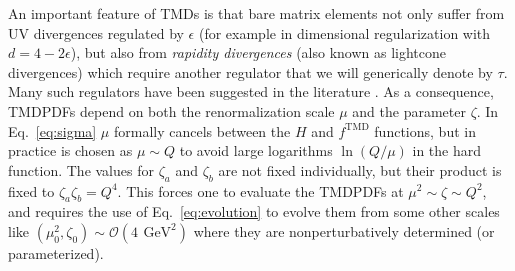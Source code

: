 \documentclass[prd,aps,twocolumn,bibnotes,nofootinbib,preprintnumbers,floatfix]{revtex4-1}
\DeclareRobustCommand{\eq}[1]{Eq.~\eqref{eq:#1}}
\newcommand{\eps}{\epsilon}
\newcommand{\cO}{\mathcal{O}}
\newcommand{\GeV}{\,\mathrm{GeV}}
\newcommand\TMD{\mathrm{TMD}}
\begin{document}
An important feature of TMDs is that bare matrix elements not only suffer from UV divergences regulated by $\epsilon$ (for example in dimensional regularization with $d=4-2\eps$), but also from \emph{rapidity divergences} (also known as lightcone divergences) which require another regulator \cite{Collins:1981uk,Collins:1992tv,Collins:2008ht,Becher:2010tm,GarciaEchevarria:2011rb,Chiu:2011qc,Chiu:2012ir} that we will generically denote by $\tau$.
Many such regulators have been suggested in the literature \cite{Collins:1981uk,Collins:1350496,Ji:2004wu,Beneke:2003pa, Chiu:2007yn, Becher:2011dz,Chiu:2011qc, Chiu:2012ir,Chiu:2009yx, GarciaEchevarria:2011rb,Li:2016axz}. As a consequence, TMDPDFs depend on both the renormalization scale $\mu$ and the parameter $\zeta$.  In \eq{sigma} $\mu$ formally cancels between the $H$ and $f^\TMD$ functions, but in practice is chosen as $\mu \sim Q$ to avoid large logarithms $\ln(Q/\mu)$ in the hard function.
The values for $\zeta_a$ and $\zeta_b$ are not fixed individually, but their product is fixed to $\zeta_a \zeta_b = Q^4$.
This forces one to evaluate the TMDPDFs at $\mu^2 \sim \zeta \sim Q^2$, and requires the use of \eq{evolution} to evolve them from some other scales like $(\mu_0^2, \zeta_0) \sim \cO(4\: \GeV^2)$ where they are nonperturbatively determined (or parameterized).
\end{document}
